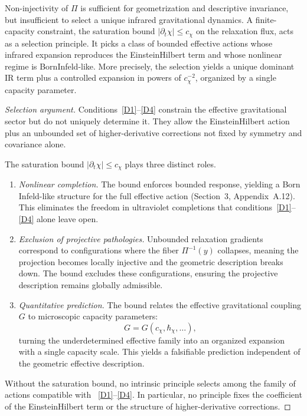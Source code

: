     \begin{lemma}
      \label{lem:saturation-selects}
      Non-injectivity of $\Pi$ is sufficient for geometrization and descriptive invariance,
      but insufficient to select a unique infrared gravitational dynamics.
      A finite-capacity constraint, the saturation bound $|\partial_t \chi| \leq c_\chi$ on the relaxation flux,
      acts as a selection principle.
      It picks a class of bounded effective actions whose infrared expansion reproduces the
      Einstein\textendash Hilbert term and whose nonlinear regime is Born\textendash Infeld-like.
      More precisely, the selection yields a unique dominant IR term plus a controlled expansion in powers of
      $c_\chi^{-2}$,
      organized by a single capacity parameter.
    \end{lemma}

    \begin{proof}[Selection argument]
    Conditions~\ref{D1}--\ref{D4} constrain the effective gravitational sector but do not uniquely determine it.
    They allow the Einstein\textendash Hilbert action plus an unbounded set of higher-derivative corrections
    not fixed by symmetry and covariance alone.

    The saturation bound $|\partial_t \chi| \leq c_\chi$ plays three distinct roles.
    \begin{enumerate}
      \item \textit{Nonlinear completion.}
      The bound enforces bounded response, yielding a Born\textendash
      Infeld-like structure for the full effective action
      (Section~3, Appendix~A.12).
      This eliminates the freedom in ultraviolet completions that conditions~\ref{D1}--\ref{D4} alone leave open.
      \item \textit{Exclusion of projective pathologies.}
      Unbounded relaxation gradients correspond to configurations where the fiber $\Pi^{-1}(y)$ collapses,
      meaning the projection becomes locally injective and the geometric description breaks down.
      The bound excludes these configurations, ensuring the projective description remains globally admissible.
      \item \textit{Quantitative prediction.}
      The bound relates the effective gravitational coupling $G$ to microscopic capacity parameters:
      \begin{equation}
        G = G(c_\chi, \hbar_\chi, \ldots),
        \label{eq:G-prediction2}
      \end{equation}
      turning the underdetermined effective family into an organized expansion with a single capacity scale.
      This yields a falsifiable prediction independent of the geometric effective description.
    \end{enumerate}

    Without the saturation bound, no intrinsic principle selects among the family of actions compatible with
    ~\ref{D1}--\ref{D4}.
    In particular, no principle fixes the coefficient of the Einstein\textendash Hilbert term or the structure of
    higher-derivative corrections.
    \end{proof}

